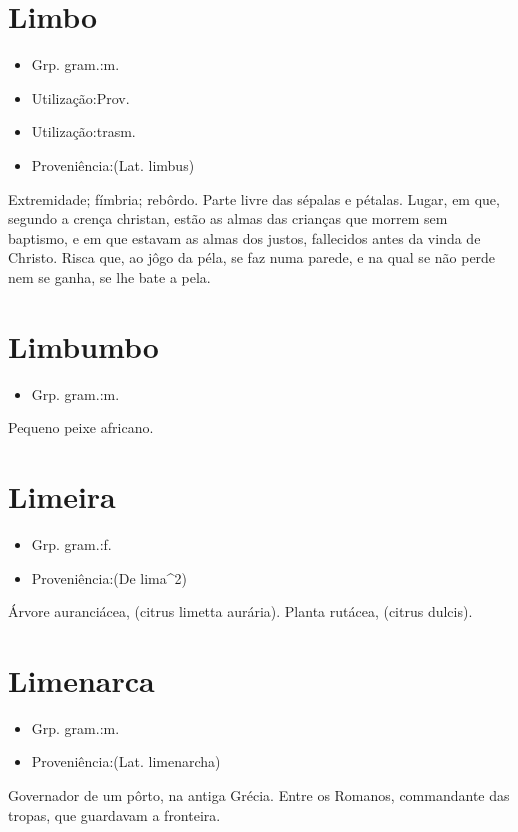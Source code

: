 \section{Limbo}
\begin{itemize}
\item {Grp. gram.:m.}
\end{itemize}
\begin{itemize}
\item {Utilização:Prov.}
\end{itemize}
\begin{itemize}
\item {Utilização:trasm.}
\end{itemize}
\begin{itemize}
\item {Proveniência:(Lat. \textunderscore limbus\textunderscore )}
\end{itemize}
Extremidade; fímbria; rebôrdo.
Parte livre das sépalas e pétalas.
Lugar, em que, segundo a crença christan, estão as almas das crianças que morrem sem baptismo, e em que estavam as almas dos justos, fallecidos antes da vinda de Christo.
Risca que, ao jôgo da péla, se faz numa parede, e na qual se não perde nem se ganha, se lhe bate a pela.
\section{Limbumbo}
\begin{itemize}
\item {Grp. gram.:m.}
\end{itemize}
Pequeno peixe africano.
\section{Limeira}
\begin{itemize}
\item {Grp. gram.:f.}
\end{itemize}
\begin{itemize}
\item {Proveniência:(De \textunderscore lima\textunderscore ^2)}
\end{itemize}
Árvore auranciácea, (\textunderscore citrus limetta aurária\textunderscore ).
Planta rutácea, (\textunderscore citrus dulcis\textunderscore ).
\section{Limenarca}
\begin{itemize}
\item {Grp. gram.:m.}
\end{itemize}
\begin{itemize}
\item {Proveniência:(Lat. \textunderscore limenarcha\textunderscore )}
\end{itemize}
Governador de um pôrto, na antiga Grécia.
Entre os Romanos, commandante das tropas, que guardavam a fronteira.
